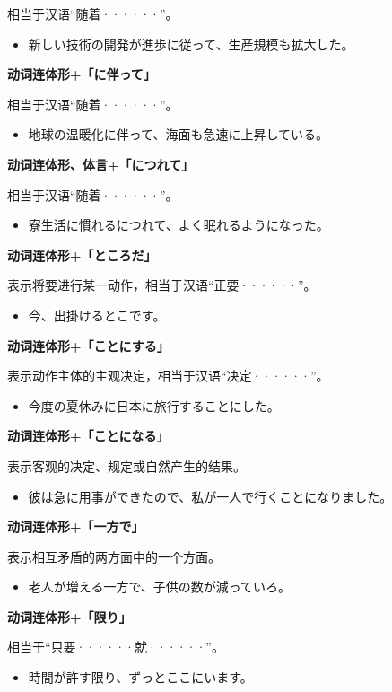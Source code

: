 相当于汉语``随着······''。
\begin{itemize}
  \item 新しい技術の開発が進歩に従って、生産規模も拡大した。
\end{itemize}

{\bf
\noindent 动词连体形+「に伴って」
}

相当于汉语``随着······''。
\begin{itemize}
  \item 地球の温暖化に伴って、海面も急速に上昇している。
\end{itemize}

{\bf
\noindent 动词连体形、体言+「につれて」
}

相当于汉语``随着······''。
\begin{itemize}
  \item 寮生活に慣れるにつれて、よく眠れるようになった。
\end{itemize}

{\bf
\noindent 动词连体形+「ところだ」
}

表示将要进行某一动作，相当于汉语``正要······''。
\begin{itemize}
  \item 今、出掛けるとこです。
\end{itemize}

{\bf
\noindent 动词连体形+「ことにする」
}

表示动作主体的主观决定，相当于汉语``决定······''。
\begin{itemize}
  \item 今度の夏休みに日本に旅行することにした。
\end{itemize}

{\bf
\noindent 动词连体形+「ことになる」
}

表示客观的决定、规定或自然产生的结果。
\begin{itemize}
  \item 彼は急に用事ができたので、私が一人で行くことになりました。
\end{itemize}

{\bf
\noindent 动词连体形+「一方で」
}

表示相互矛盾的两方面中的一个方面。
\begin{itemize}
  \item 老人が増える一方で、子供の数が減っていろ。
\end{itemize}

{\bf
\noindent 动词连体形+「限り」
}

相当于``只要······就······''。
\begin{itemize}
  \item 時間が許す限り、ずっとここにいます。
\end{itemize}


